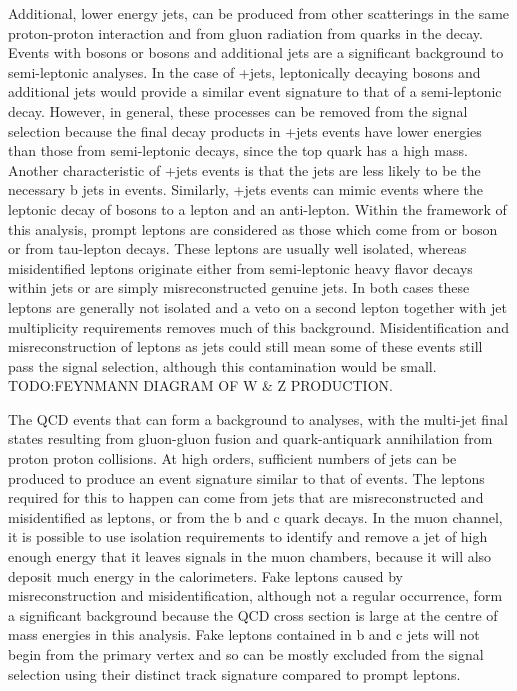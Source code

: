 Additional, lower energy jets, can be produced from other scatterings in the same proton-proton interaction
and from gluon radiation from quarks in the decay. Events with \W bosons or \Z bosons and additional jets are
a significant background to semi-leptonic \ttbar analyses. In the case of \W+jets, leptonically decaying \W
bosons and additional jets would provide a similar event signature to that of a semi-leptonic \ttbar decay.
However, in general, these processes can be removed from the signal selection because the final decay products
in \W+jets events have lower energies than those from semi-leptonic \ttbar decays, since the top quark has a
high mass. Another characteristic of \W+jets events is that the jets are less likely to be the necessary b
jets in \ttbar events. Similarly, \Z+jets events can mimic \ttbar events where the leptonic decay of \Z bosons
to a lepton and an anti-lepton. Within the framework of this analysis, prompt leptons are considered as those
which come from \W or \Z boson or from tau-lepton decays. These leptons are usually well isolated, whereas
misidentified leptons originate either from semi-leptonic heavy flavor decays within jets or are simply
misreconstructed genuine jets. In both cases these leptons are generally not isolated and a veto on a second
lepton together with jet multiplicity requirements removes much of this background. Misidentification and
misreconstruction of leptons as jets could still mean some of these events still pass the signal selection,
although this contamination would be small. TODO:FEYNMANN DIAGRAM OF W \& Z PRODUCTION.



The QCD events that can form a background to \ttbar analyses, with the multi-jet final states resulting from
gluon-gluon fusion and quark-antiquark annihilation from proton proton collisions. At high orders, sufficient
numbers of jets can be produced to produce an event signature similar to that of \ttbar events. The leptons
required for this to happen can come from jets that are misreconstructed and misidentified as leptons, or from
the b and c quark decays. In the muon channel, it is possible to use isolation requirements to identify and
remove a jet of high enough energy that it leaves signals in the muon chambers, because it will also deposit
much energy in the calorimeters. Fake leptons caused by misreconstruction and misidentification, although not
a regular occurrence, form a significant background because the QCD cross section is large at the centre of
mass energies in this analysis. Fake leptons contained in b and c jets will not begin from the primary vertex
and so can be mostly excluded from the signal selection using their distinct track signature compared to prompt
leptons.

